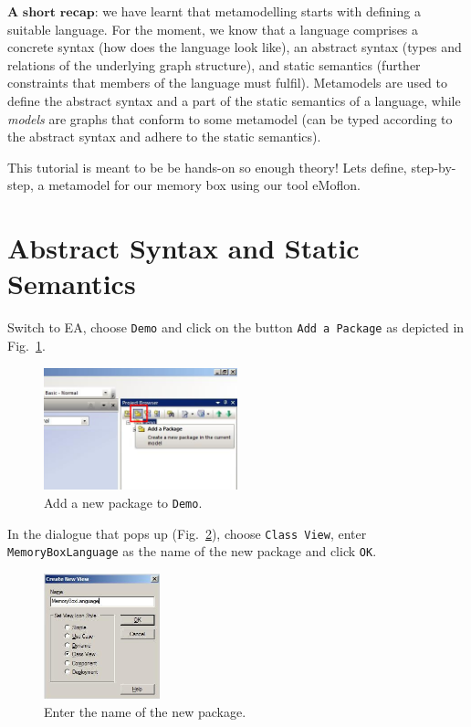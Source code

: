 $\textbf{A short recap:}$  we have learnt that metamodelling starts with
defining a suitable language.  
For the moment, we know that a language comprises a concrete
syntax (how does the language look like),  an abstract syntax (types and
relations of the underlying graph structure), and static semantics (further
constraints that members of the language must fulfil).
Metamodels are used to define the abstract syntax and a part of the static
semantics of a language, while \emph{models} are graphs that conform to some
metamodel (can be typed  according to the abstract syntax and adhere to the
static semantics). 

This tutorial is meant to be be hands-on so enough theory!  Lets
define, step-by-step, a metamodel for our memory box using our tool eMoflon.  
  
\section{Abstract Syntax and Static Semantics}
\label{sec:abstractSyntax}

Switch to EA, choose \texttt{Demo} and click on the button \texttt{Add a
Package} as depicted in Fig.~\ref{fig:new_package}.   

\begin{figure}[htbp]
	\centering
  \includegraphics[width=0.5\textwidth]{pics/memBoxBilder/memBox01.png}
	\caption{Add a new package to \texttt{Demo}.}
	\label{fig:new_package}
\end{figure} 

In the dialogue that pops up (Fig.~\ref{fig:new_package_name}), choose
\texttt{Class View}, enter \texttt{Memory\-Box\-Language} as the name of the new
package and click \texttt{OK}. 

\begin{figure}[htbp]
	\centering
    \includegraphics[width=0.3\textwidth]{pics/memBoxBilder/memBox02.png}
	\caption{Enter the name of the new package.}
	\label{fig:new_package_name}
\end{figure}

